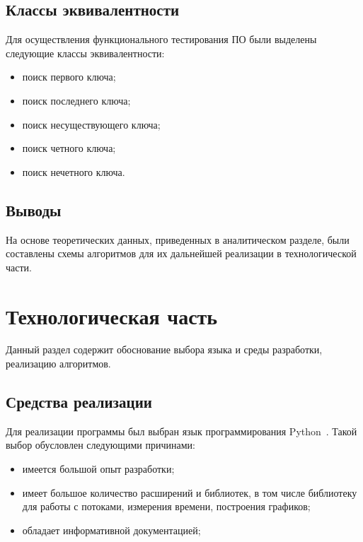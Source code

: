 \documentclass[a4paper,oneside,14pt]{extreport}
\begin{document}
\section{Классы эквивалентности}
Для осуществления функционального тестирования ПО были выделены следующие классы эквивалентности:
\begin{itemize}
	\item поиск первого ключа;
	\item поиск последнего ключа;
	\item поиск несуществующего ключа;
	\item поиск четного ключа;
	\item поиск нечетного ключа.
\end{itemize}

\section{Выводы}
На основе теоретических данных, приведенных в аналитическом разделе, были составлены схемы алгоритмов для их дальнейшей реализации в технологической части.
\newpage
\chapter{Технологическая часть}
Данный раздел содержит обоснование выбора языка и среды разработки, реализацию алгоритмов.

\section{Средства реализации}
Для реализации программы был выбран язык программирования Python~\cite{python}. Такой выбор обусловлен следующими причинами:
\begin{itemize}
	\item имеется большой опыт разработки;
	\item имеет большое количество расширений и библиотек, в том числе библиотеку для работы с потоками, измерения времени, построения графиков;
	\item обладает информативной документацией;
\end{itemize}
\end{document}

